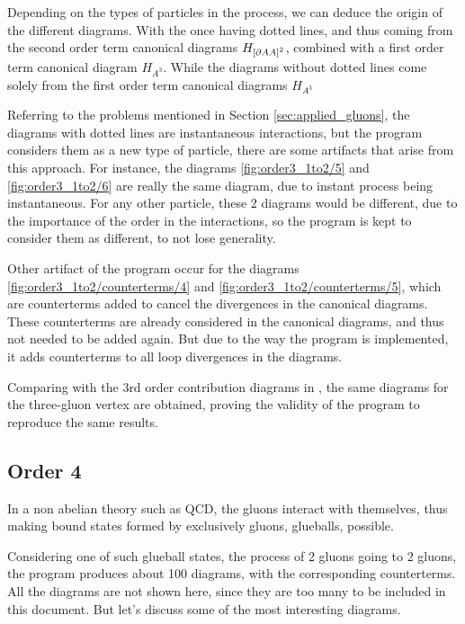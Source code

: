 \documentclass[11pt,a4paper,twoside,pdf]{article}
\numberwithin{equation}{section}
\begin{document}
Depending on the types of particles in the process, we can deduce the origin of the 
different diagrams. With the once having dotted lines, and thus coming from the second
order term canonical diagrams $H_{\left[ \partial A A \right]^2}$, combined with a first 
order term canonical diagram $H_{A^3}$. While the diagrams without dotted lines
come solely from the first order term canonical diagrams $H_{A^3}$

Referring to the problems mentioned in Section \ref{sec:applied_gluons}, the diagrams 
with dotted lines are instantaneous interactions, but the program considers them
as a new type of particle, there are some artifacts that arise from this
approach. For instance, the diagrams \ref{fig:order3_1to2/5} and \ref{fig:order3_1to2/6} are really the same 
diagram, due to instant process being instantaneous. For any other particle, these 
2 diagrams would be different, due to the importance of the order in the interactions,
so the program is kept to consider them as different, to not lose generality.

Other artifact of the program occur for the diagrams \ref{fig:order3_1to2/counterterms/4} and
\ref{fig:order3_1to2/counterterms/5}, which are counterterms added to cancel the divergences
in the canonical diagrams. These counterterms are already considered in the canonical diagrams, 
and thus not needed to be added again. But due to the way the program is implemented,
it adds counterterms to all loop divergences in the diagrams.

Comparing with the 3rd order contribution diagrams in \cite{QCDG}, the same diagrams
for the three-gluon vertex are obtained, proving the validity of the program to reproduce the same results.



\subsection{Order 4}

In a non abelian theory such as QCD, the gluons interact with themselves, thus making 
bound states formed by exclusively gluons, glueballs, possible. 

Considering one of such glueball states, the process of 2 gluons going to 2 gluons, the program
produces about 100 diagrams, with the corresponding counterterms. All the diagrams are
not shown here, since they are too many to be included in this document. But let's 
discuss some of the most interesting diagrams.
\end{document}
